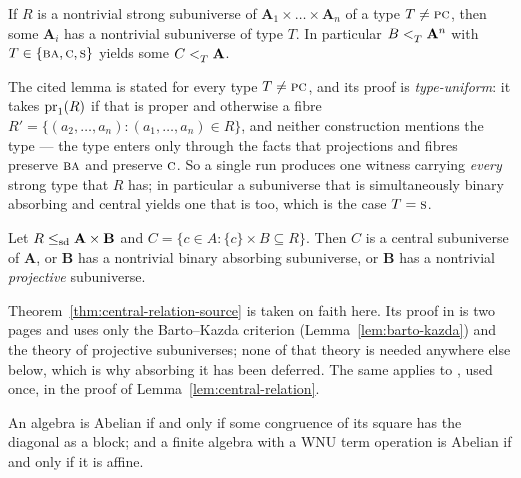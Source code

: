 \begin{lemma}\label{lem:power-to-base}
If $R$ is a nontrivial strong subuniverse of
$\mathbf A_{1}\times\dots\times\mathbf A_{n}$ of a type $T\neq\textup{\textsc{pc}}$, then some
$\mathbf A_{i}$ has a nontrivial subuniverse of type $T$. In particular
$B<_{T}^{}\mathbf A^{n}$ with $T\in\{\textup{\textsc{ba}},\textup{\textsc{c}},\textup{\textsc{s}}\}$ yields some
$C<_{T}^{}\mathbf A$.
\end{lemma}

\begin{hazard}\label{haz:power-to-base}
The cited lemma is stated for every type $T\neq\textup{\textsc{pc}}$, and its proof is
\emph{type-uniform}: it takes $\operatorname*{pr}_{1}(R)$ if that is proper and otherwise a
fibre $R'=\{(a_{2},\dots,a_{n}):(a_{1},\dots,a_{n})\in R\}$, and neither
construction mentions the type --- the type enters only through the facts that
projections and fibres preserve $\textup{\textsc{ba}}$ and preserve $\textup{\textsc{c}}$. So a single run
produces one witness carrying \emph{every} strong type that $R$ has; in
particular a subuniverse that is simultaneously binary absorbing and central
yields one that is too, which is the case $T=\textup{\textsc{s}}$.
\end{hazard}

\begin{longtheorem}\label{thm:central-relation-source}
Let $R\le_{\mathrm{sd}}\mathbf A\times\mathbf B$ and
$C=\{c\in A:\{c\}\times B\subseteq R\}$. Then $C$ is a central subuniverse of
$\mathbf A$, or $\mathbf B$ has a nontrivial binary absorbing subuniverse, or
$\mathbf B$ has a nontrivial \emph{projective} subuniverse.
\end{longtheorem}

\begin{hazard}
\label{haz:615-todo}
Theorem~\ref{thm:central-relation-source} is taken on faith here. Its proof in
\cite{ZhukStrong} is two pages and uses only the Barto--Kazda criterion
(Lemma~\ref{lem:barto-kazda}) and the theory of projective subuniverses; none
of that theory is needed anywhere else below, which is why absorbing it has
been deferred. The same applies to \cite[Lem.~3.4]{ZhukStrong}, used once, in
the proof of Lemma~\ref{lem:central-relation}.
\end{hazard}

\begin{lemma}\label{lem:hobby-mckenzie}
An algebra is Abelian if and only if some congruence of its square has the
diagonal as a block; and a finite algebra with a WNU term operation is Abelian
if and only if it is affine.
\end{lemma}


